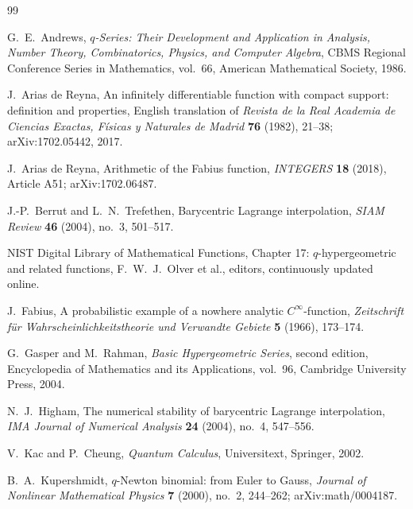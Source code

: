\documentclass[11pt,oneside]{book}
\numberwithin{equation}{chapter}
\theoremstyle{definition}
\theoremstyle{remark}
\begin{document}
\begin{thebibliography}{99}

G.~E.~Andrews,
\newblock \emph{$q$-Series: Their Development and Application in Analysis,
Number Theory, Combinatorics, Physics, and Computer Algebra},
\newblock CBMS Regional Conference Series in Mathematics, vol.~66,
American Mathematical Society, 1986.

J.~Arias de Reyna,
\newblock An infinitely differentiable function with compact support:
definition and properties,
\newblock English translation of \emph{Revista de la Real Academia de
Ciencias Exactas, F\'isicas y Naturales de Madrid} \textbf{76} (1982),
21--38; arXiv:1702.05442, 2017.

J.~Arias de Reyna,
\newblock Arithmetic of the Fabius function,
\newblock \emph{INTEGERS} \textbf{18} (2018), Article A51;
arXiv:1702.06487.

J.-P.~Berrut and L.~N.~Trefethen,
\newblock Barycentric Lagrange interpolation,
\newblock \emph{SIAM Review} \textbf{46} (2004), no.~3, 501--517.

NIST Digital Library of Mathematical Functions,
\newblock Chapter 17: $q$-hypergeometric and related functions,
\newblock F.~W.~J.~Olver et al., editors, continuously updated online.

J.~Fabius,
\newblock A probabilistic example of a nowhere analytic $C^\infty$-function,
\newblock \emph{Zeitschrift f\"ur Wahrscheinlichkeitstheorie und Verwandte
Gebiete} \textbf{5} (1966), 173--174.

G.~Gasper and M.~Rahman,
\newblock \emph{Basic Hypergeometric Series}, second edition,
\newblock Encyclopedia of Mathematics and its Applications, vol.~96,
Cambridge University Press, 2004.

N.~J.~Higham,
\newblock The numerical stability of barycentric Lagrange interpolation,
\newblock \emph{IMA Journal of Numerical Analysis} \textbf{24} (2004),
no.~4, 547--556.

V.~Kac and P.~Cheung,
\newblock \emph{Quantum Calculus},
\newblock Universitext, Springer, 2002.

B.~A.~Kupershmidt,
\newblock $q$-Newton binomial: from Euler to Gauss,
\newblock \emph{Journal of Nonlinear Mathematical Physics} \textbf{7}
(2000), no.~2, 244--262; arXiv:math/0004187.


\end{thebibliography}
\end{document}
